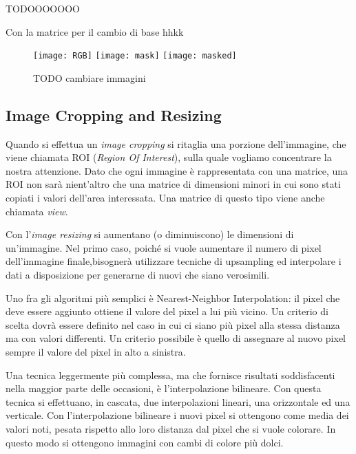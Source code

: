 TODOOOOOOO

Con la matrice per il cambio di base hhkk
\begin{figure}[ht] %
  \begin{center}
    \texttt{[image: RGB]}
    \texttt{[image: mask]}
    \texttt{[image: masked]}
    \caption{TODO cambiare immagini}
    \label{fig:traslation_example}
  \end{center}
\end{figure}

\clearpage
\subsection {Image Cropping and Resizing}
Quando si effettua un \textit{image cropping} si ritaglia una porzione dell'immagine, che viene chiamata ROI (\textit{Region Of Interest}), sulla quale vogliamo concentrare la nostra attenzione.
Dato che ogni immagine è rappresentata con una matrice, una ROI non sarà nient'altro che una matrice di dimensioni minori in cui sono stati copiati i valori dell'area interessata.
Una matrice di questo tipo viene anche chiamata \textit{view}.

Con l'\textit{image resizing} si aumentano (o diminuiscono) le dimensioni di un'immagine.
Nel primo caso, poiché si vuole aumentare il numero di pixel dell'immagine finale,bisognerà utilizzare tecniche di upsampling ed interpolare i dati a disposizione per generarne di nuovi che siano verosimili.

Uno fra gli algoritmi più semplici è Nearest-Neighbor Interpolation:
il pixel che deve essere aggiunto ottiene il valore del pixel a lui più vicino.
Un criterio di scelta dovrà essere definito nel caso in cui ci siano più pixel alla stessa distanza ma con valori differenti.
Un criterio possibile è quello di assegnare al nuovo pixel sempre il valore del pixel in alto a sinistra.

Una tecnica leggermente più complessa, ma che fornisce risultati soddisfacenti nella maggior parte delle occasioni, è l'interpolazione bilineare.
Con questa tecnica si effettuano, in cascata, due interpolazioni lineari, una orizzontale ed una verticale.
Con l'interpolazione bilineare i nuovi pixel si ottengono come media dei valori noti, pesata rispetto allo loro distanza dal pixel che si vuole colorare.
In questo modo si ottengono immagini con cambi di colore più dolci.

